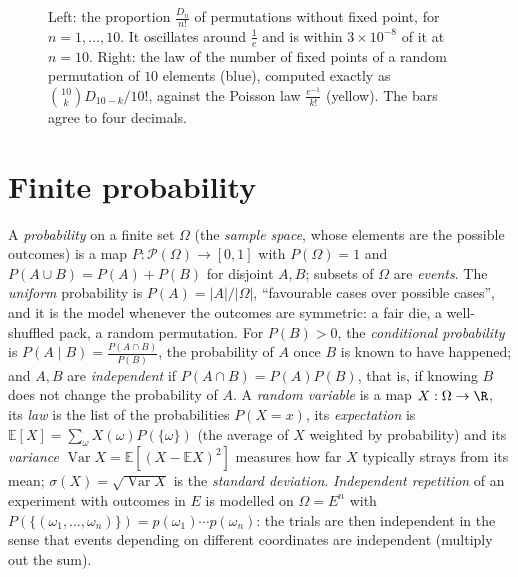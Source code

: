 \begin{figure}[ht]
\centering
{}
\caption{Left: the proportion $\frac{D_n}{n!}$ of permutations without fixed point, for $n=1,\dots,10$. It oscillates around $\frac1e$ and is within $3\times10^{-8}$ of it at $n=10$. Right: the law of the number of fixed points of a random permutation of $10$ elements (blue), computed exactly as $\binom{10}kD_{10-k}/10!$, against the Poisson law $\frac{e^{-1}}{k!}$ (yellow). The bars agree to four decimals.}
\label{fig:derang}
\end{figure}

\section{Finite probability}

\begin{reminder}
A \emph{probability} on a finite set $\Omega$ (the \emph{sample space}, whose elements are the possible outcomes) is a map $P:\mathcal P(\Omega)\to[0,1]$ with $P(\Omega)=1$ and $P(A\cup B)=P(A)+P(B)$ for disjoint $A,B$; subsets of $\Omega$ are \emph{events}. The \emph{uniform} probability is $P(A)=|A|/|\Omega|$, ``favourable cases over possible cases'', and it is the model whenever the outcomes are symmetric: a fair die, a well-shuffled pack, a random permutation. For $P(B)>0$, the \emph{conditional probability} is $P(A\mid B)=\frac{P(A\cap B)}{P(B)}$, the probability of $A$ once $B$ is known to have happened; and $A,B$ are \emph{independent} if $P(A\cap B)=P(A)P(B)$, that is, if knowing $B$ does not change the probability of $A$. A \emph{random variable} is a map $X:\Omega\to\R$, its \emph{law} is the list of the probabilities $P(X=x)$, its \emph{expectation} is $\mathbb E[X]=\sum_\omega X(\omega)P(\{\omega\})$ (the average of $X$ weighted by probability) and its \emph{variance} $\operatorname{Var}X=\mathbb E\left[(X-\mathbb E X)^2\right]$ measures how far $X$ typically strays from its mean; $\sigma(X)=\sqrt{\operatorname{Var}X}$ is the \emph{standard deviation}. \emph{Independent repetition} of an experiment with outcomes in $E$ is modelled on $\Omega=E^n$ with $P(\{(\omega_1,\dots,\omega_n)\})=p(\omega_1)\cdots p(\omega_n)$: the trials are then independent in the sense that events depending on different coordinates are independent (multiply out the sum).
\end{reminder}

